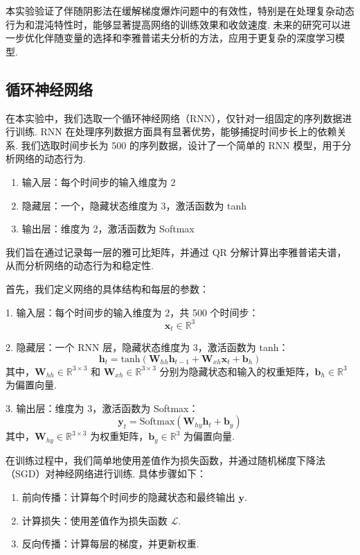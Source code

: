 本实验验证了伴随阴影法在缓解梯度爆炸问题中的有效性，特别是在处理复杂动态行为和混沌特性时，能够显著提高网络的训练效果和收敛速度. 未来的研究可以进一步优化伴随变量的选择和李雅普诺夫分析的方法，应用于更复杂的深度学习模型. 

\subsection{循环神经网络}

在本实验中，我们选取一个循环神经网络（RNN），仅针对一组固定的序列数据进行训练. RNN 在处理序列数据方面具有显著优势，能够捕捉时间步长上的依赖关系. 我们选取时间步长为 500 的序列数据，设计了一个简单的 RNN 模型，用于分析网络的动态行为. 

\begin{enumerate}
   \item 输入层：每个时间步的输入维度为 2
   \item 隐藏层：一个，隐藏状态维度为 3，激活函数为 tanh
   \item 输出层：维度为 2，激活函数为 Softmax
\end{enumerate}

我们旨在通过记录每一层的雅可比矩阵，并通过 QR 分解计算出李雅普诺夫谱，从而分析网络的动态行为和稳定性. 

首先，我们定义网络的具体结构和每层的参数：

1. 输入层：每个时间步的输入维度为 2，共 500 个时间步：
   \[
   \mathbf{x}_t \in \mathbb{R}^{3}
   \]

2. 隐藏层：一个 RNN 层，隐藏状态维度为 3，激活函数为 tanh：
   \[
   \mathbf{h}_t = \text{tanh}(\mathbf{W}_{hh} \mathbf{h}_{t-1} + \mathbf{W}_{xh} \mathbf{x}_t + \mathbf{b}_h)
   \]
   其中，\(\mathbf{W}_{hh} \in \mathbb{R}^{3 \times 3}\) 和 \(\mathbf{W}_{xh} \in \mathbb{R}^{3 \times 3}\) 分别为隐藏状态和输入的权重矩阵，\(\mathbf{b}_h \in \mathbb{R}^{3}\) 为偏置向量. 

3. 输出层：维度为 3，激活函数为 Softmax：
   \[
   \mathbf{y}_t = \text{Softmax}(\mathbf{W}_{hy} \mathbf{h}_t + \mathbf{b}_y)
   \]
   其中，\(\mathbf{W}_{hy} \in \mathbb{R}^{3 \times 3}\) 为权重矩阵，\(\mathbf{b}_y \in \mathbb{R}^{3}\) 为偏置向量. 

在训练过程中，我们简单地使用差值作为损失函数，并通过随机梯度下降法（SGD）对神经网络进行训练. 具体步骤如下：

\begin{enumerate}
   \item 前向传播：计算每个时间步的隐藏状态和最终输出 \(\mathbf{y}\). 
   \item 计算损失：使用差值作为损失函数 \(\mathcal{L}\). 
   \item 反向传播：计算每层的梯度，并更新权重. 
\end{enumerate}


